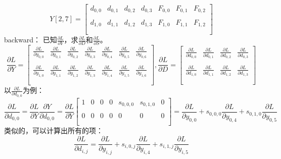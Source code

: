 \documentclass{article}
\begin{document}
$$
Y[2, 7]=
\begin{bmatrix}
    d_{0,0} & d_{0,1} & d_{0,2} & d_{0,3} & F_{0, 0} & F_{0, 1} & F_{0, 2} \\\\
    d_{1,0} & d_{1,1} & d_{1,2} & d_{1,3} & F_{1, 0} & F_{1, 1} & F_{1, 2} \\\\
\end{bmatrix}
$$
backward：
已知$\frac{\partial L}{\partial Y}$，求$\frac{\partial L}{\partial D}$和$\frac{\partial L}{\partial S}$。
$$
\frac{\partial L}{\partial Y} = 
\begin{bmatrix}
    \frac{\partial L}{\partial y_{0,0}} & \frac{\partial L}{\partial y_{0,1}} & \frac{\partial L}{\partial y_{0,2}} & \frac{\partial L}{\partial y_{0,3}} & \frac{\partial L}{\partial y_{0,4}} & \frac{\partial L}{\partial y_{0,5}}& \frac{\partial L}{\partial y_{0,6}} \\\\
    \frac{\partial L}{\partial y_{1,0}} & \frac{\partial L}{\partial y_{1,1}} & \frac{\partial L}{\partial y_{1,2}} & \frac{\partial L}{\partial y_{1,3}} & \frac{\partial L}{\partial y_{1,4}} & \frac{\partial L}{\partial y_{1,5}}& \frac{\partial L}{\partial y_{1,6}} \\\\
\end{bmatrix}
,
\frac{\partial L}{\partial D} = 
\begin{bmatrix}
    \frac{\partial L}{\partial d_{0,0}} & \frac{\partial L}{\partial d_{0,1}} & \frac{\partial L}{\partial d_{0,2}} & \frac{\partial L}{\partial d_{0,3}} \\\\
    \frac{\partial L}{\partial d_{1,0}} & \frac{\partial L}{\partial d_{1,1}} & \frac{\partial L}{\partial d_{1,2}} & \frac{\partial L}{\partial d_{1,3}} \\\\
\end{bmatrix}
$$
以$\frac{\partial L}{\partial d_{0,0}}$为例：
$$
\frac{\partial L}{\partial d_{0,0}} = \frac{\partial L}{\partial Y} \frac{\partial Y}{\partial d_{0,0}} 
=\frac{\partial L}{\partial Y}
\begin{bmatrix}
    1 & 0 & 0 & 0 & s_{0,0,0} & s_{0,1,0} & 0 \\\\
    0 & 0 & 0 & 0 &         0 &         0 & 0 \\\\ 
\end{bmatrix}
=\frac{\partial L}{\partial y_{0,0}}+s_{0,0,0}\frac{\partial L}{\partial y_{0,4}}+s_{0,1,0}\frac{\partial L}{\partial y_{0,5}}
$$
类似的，可以计算出所有的项：
$$
\frac{\partial L}{\partial d_{i,j}}=\frac{\partial L}{\partial y_{i,j}}+s_{i,0,j}\frac{\partial L}{\partial y_{i,4}}+s_{i,1,j}\frac{\partial L}{\partial y_{i,5}}
$$
\end{document}
